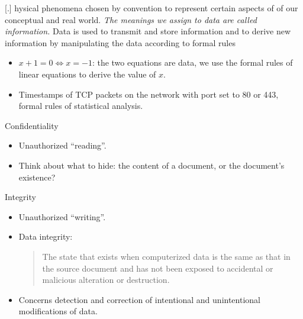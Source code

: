 \begin{frame}
  \begin{definition}
    [.]{%
       hysical phenomena chosen by convention 
      to represent certain aspects of of our conceptual and real world.
      \emph{The meanings we assign to data are called information.} 
      Data is used to transmit and store information and to derive new 
      information by manipulating the data according to formal rules%
    }
  \end{definition}
\end{frame}

\begin{frame}
  \begin{example}
    \begin{itemize}
      \item \(x + 1 = 0\iff x = -1\): the two equations are data, we use the 
        formal rules of linear equations to derive the value of \(x\).
    \end{itemize}
  \end{example}

  \begin{example}
    \begin{itemize}
      \item Timestamps of TCP packets on the network with port set to 80 or 443, 
        formal rules of statistical analysis.
    \end{itemize}
  \end{example}
\end{frame}

\begin{frame}
  \begin{block}{Confidentiality}
    \begin{itemize}
      \item Unauthorized \enquote{reading}.

      \item Think about what to hide: the content of a document, or the 
        document's existence?
    \end{itemize}
  \end{block}
\end{frame}

\begin{frame}
  \begin{block}{Integrity}
    \begin{itemize}
      \item Unauthorized \enquote{writing}.

      \item Data integrity: \blockquote{The state that exists when computerized 
          data is the same as that in the source document and has not been exposed 
          to accidental or malicious alteration or destruction.}

      \item Concerns detection and correction of intentional and unintentional 
        modifications of data.
    \end{itemize}
  \end{block}
\end{frame}

